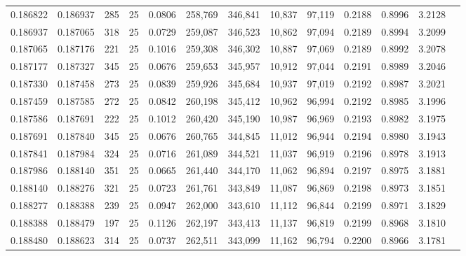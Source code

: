 \begin{tabular}{rrrrrrrrrrrrr}
0.186822 & 0.186937 &   285 &  25 &                                     0.0806 & 258,769 & 346,841 &  10,837 &  97,119 & 0.2188 & 0.8996 & 3.2128 \\
0.186937 & 0.187065 &   318 &  25 &                                     0.0729 & 259,087 & 346,523 &  10,862 &  97,094 & 0.2189 & 0.8994 & 3.2099 \\
0.187065 & 0.187176 &   221 &  25 &                                     0.1016 & 259,308 & 346,302 &  10,887 &  97,069 & 0.2189 & 0.8992 & 3.2078 \\
0.187177 & 0.187327 &   345 &  25 &                                     0.0676 & 259,653 & 345,957 &  10,912 &  97,044 & 0.2191 & 0.8989 & 3.2046 \\
0.187330 & 0.187458 &   273 &  25 &                                     0.0839 & 259,926 & 345,684 &  10,937 &  97,019 & 0.2192 & 0.8987 & 3.2021 \\
0.187459 & 0.187585 &   272 &  25 &                                     0.0842 & 260,198 & 345,412 &  10,962 &  96,994 & 0.2192 & 0.8985 & 3.1996 \\
0.187586 & 0.187691 &   222 &  25 &                                     0.1012 & 260,420 & 345,190 &  10,987 &  96,969 & 0.2193 & 0.8982 & 3.1975 \\
0.187691 & 0.187840 &   345 &  25 &                                     0.0676 & 260,765 & 344,845 &  11,012 &  96,944 & 0.2194 & 0.8980 & 3.1943 \\
0.187841 & 0.187984 &   324 &  25 &                                     0.0716 & 261,089 & 344,521 &  11,037 &  96,919 & 0.2196 & 0.8978 & 3.1913 \\
0.187986 & 0.188140 &   351 &  25 &                                     0.0665 & 261,440 & 344,170 &  11,062 &  96,894 & 0.2197 & 0.8975 & 3.1881 \\
0.188140 & 0.188276 &   321 &  25 &                                     0.0723 & 261,761 & 343,849 &  11,087 &  96,869 & 0.2198 & 0.8973 & 3.1851 \\
0.188277 & 0.188388 &   239 &  25 &                                     0.0947 & 262,000 & 343,610 &  11,112 &  96,844 & 0.2199 & 0.8971 & 3.1829 \\
0.188388 & 0.188479 &   197 &  25 &                                     0.1126 & 262,197 & 343,413 &  11,137 &  96,819 & 0.2199 & 0.8968 & 3.1810 \\
0.188480 & 0.188623 &   314 &  25 &                                     0.0737 & 262,511 & 343,099 &  11,162 &  96,794 & 0.2200 & 0.8966 & 3.1781 \\

\end{tabular}
